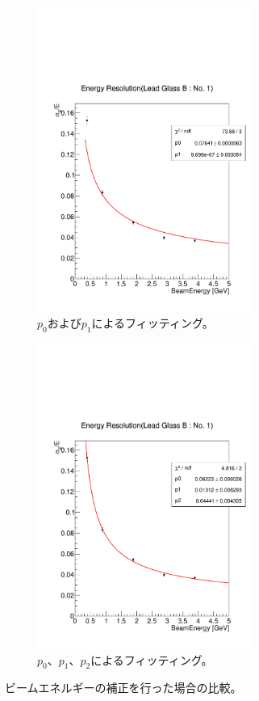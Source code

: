 \begin{figure}[H]
	\begin{subfigure}{.5\textwidth}
		\begin{center}
 		 	\includegraphics[width=200pt]{./Figure/EBESAnalysis/res_re_twopara_fixbeam.pdf} 
			  \caption{$p_0$および$p_1$によるフィッティング。}
  			\label{fig:sfig1}
 		\end{center}
	\end{subfigure}
	\begin{subfigure}{.5\textwidth}
		\begin{center}
			\includegraphics[width=200pt]{./Figure/EBESAnalysis/res_re_threepara_fixbeam.pdf}%
			\caption{$p_0$、$p_1$、$p_2$によるフィッティング。}
			\label{fig:sfig2}
		\end{center}
	\end{subfigure}
	\caption[ビームエネルギーの補正を行った場合の比較。]{ビームエネルギーの補正を行った場合の比較。}
	\label{res_re_fixbeam}
\end{figure}

